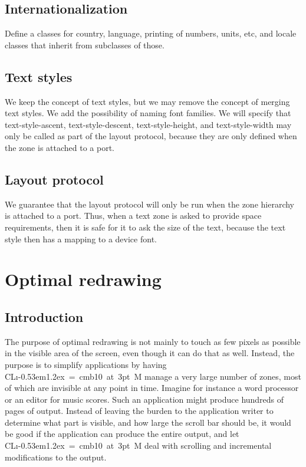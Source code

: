 \documentclass{report}
\def\Tiny{ \font\Tinyfont = cmb10 at 3pt \relax  \Tinyfont}
\def\clim{\textsf{CL{\i}\kern-0.53em\raise1.2ex\hbox{\Tiny 3}M}}
\begin{document}
\section{Internationalization}

Define a classes for country, language, printing of numbers, units,
etc, and locale classes that inherit from subclasses of those.

\section{Text styles}

We keep the concept of text styles, but we may remove the concept of
merging text styles.  We add the possibility of naming font families. 
We will specify that text-style-ascent, text-style-descent,
text-style-height, and text-style-width may only be called as part of
the layout protocol, because they are only defined when the zone is
attached to a port. 

\section{Layout protocol}

We guarantee that the layout protocol will only be run when the zone
hierarchy is attached to a port.  Thus, when a text zone is asked to
provide space requirements, then it is safe for it to ask the size of
the text, because the text style then has a mapping to a device font. 

\chapter{Optimal redrawing}

\section{Introduction}

The purpose of optimal redrawing is not mainly to touch as few pixels
as possible in the visible area of the screen, even though it can do
that as well.  Instead, the purpose is to simplify applications by
having \clim{} manage a very large number of zones, most of which
are invisible at any point in time.  Imagine for instance a word
processor or an editor for music scores.  Such an application might
produce hundreds of pages of output.  Instead of leaving the burden to
the application writer to determine what part is visible, and how
large the scroll bar should be, it would be good if the application
can produce the entire output, and let \clim{} deal with scrolling and
incremental modifications to the output.  
\end{document}
